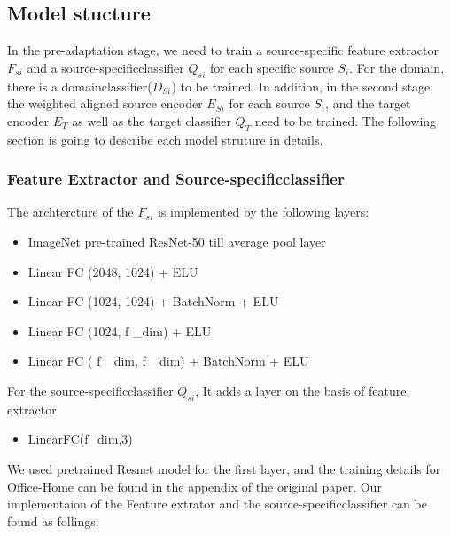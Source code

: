 \documentclass[11pt]{article}
\providecommand{\tightlist}{%
      \setlength{\itemsep}{0pt}\setlength{\parskip}{0pt}}
\begin{document}
    \hypertarget{model-stucture}{%
\subsection{Model stucture}\label{model-stucture}}

In the pre-adaptation stage, we need to train a source-specific feature
extractor \(F_{si}\) and a source-specificclassifier \(Q_{si}\) for each
specific source \(S_i\). For the domain, there is a
domainclassifier(\(D_{Si}\)) to be trained. In addition, in the second
stage, the weighted aligned source encoder \(E_{Si}\) for each source
\(S_i\), and the target encoder \(E_T\) as well as the target classifier
\(Q_T\) need to be trained. The following section is going to describe
each model struture in details.

    \hypertarget{feature-extractor-and-source-specificclassifier}{%
\subsubsection{Feature Extractor and
Source-specificclassifier}\label{feature-extractor-and-source-specificclassifier}}

The archtercture of the \(F_{si}\) is implemented by the following
layers:

\begin{itemize}
\tightlist
\item
  ImageNet pre-trained ResNet-50 till average pool layer
\item
  Linear FC (2048, 1024) + ELU
\item
  Linear FC (1024, 1024) + BatchNorm + ELU
\item
  Linear FC (1024, f \_dim) + ELU
\item
  Linear FC ( f \_dim, f \_dim) + BatchNorm + ELU
\end{itemize}

For the source-specificclassifier \(Q_{si}\), It adds a layer on the
basis of feature extractor

\begin{itemize}
\tightlist
\item
  LinearFC(f\_dim,3)
\end{itemize}

We used pretrained Resnet model for the first layer, and the training
details for Office-Home can be found in the appendix of the original
paper. Our implementaion of the Feature extrator and the
source-specificclassifier can be found as follings:
\end{document}
